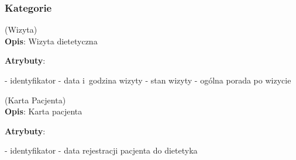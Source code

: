 \subsubsection{Kategorie}\label{subsubsec:database:appointments:categories}
\begin{enumerate}[label={\textbf{KAT/3/\protect\twodigits{\theenumi}}}, wide, labelwidth=!, labelindent=0pt, labelsep=0pt, series=reqs]
    \setlength\itemsep{1.75em}
    \label{kat:Appointment} (Wizyta)\\
    \indent\textbf{Opis}: Wizyta dietetyczna
    \par
    \textbf{Atrybuty}:
    \begin{itemize}[series=atr, wide, align=left, leftmargin=190pt]
        \label{kat:Appointment:id}- identyfikator
        \label{kat:Appointment:appointmentDate}- data i~godzina wizyty
        \label{kat:Appointment:appointmentState}- stan wizyty
        \label{kat:Appointment:generalAdvice}- ogólna porada po wizycie
    \end{itemize}

    \label{kat:PatientCard} (Karta Pacjenta)\\
    \indent\textbf{Opis}: Karta pacjenta
    \par
    \textbf{Atrybuty}:
    \begin{itemize}[series=atr, wide, align=left, leftmargin=190pt]
        \label{kat:PatientCard:id}- identyfikator
        \label{kat:PatientCard:creationDate}- data rejestracji pacjenta do dietetyka
    \end{itemize}


\end{enumerate}
